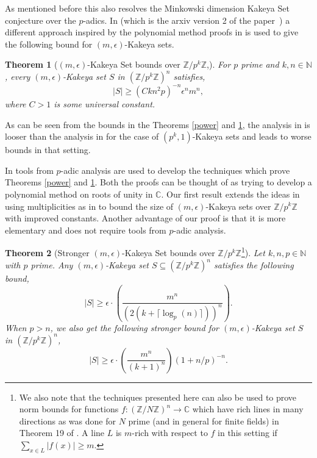 \documentclass[11pt]{article}
\numberwithin{equation}{section}
\newtheorem{thm}{Theorem}[section]
\def\Z{{\mathbb{Z}}}
\def\N{{\mathbb{N}}}
\def\C{{\mathbb{C}}}
\begin{document}
As mentioned before this also resolves the Minkowski dimension Kakeya Set conjecture over the $p$-adics. In \cite{arsovskiNew} (which is the arxiv version 2 of the paper~\cite{arsovski2021padic}) a different approach inspired by the polynomial method proofs in \cite{dvir2009size,saraf2008,dvir2013extensions} is used to give the following bound for $(m,\epsilon)$-Kakeya sets.

\begin{thm}[$(m,\epsilon)$-Kakeya Set bounds over $\Z/p^k\Z$,{\cite[Theorem~3]{arsovskiNew}}]\label{power2}
For $p$ prime and $k,n\in \N$, every $(m,\epsilon)$-Kakeya set $S$ in $(\Z/p^k\Z)^n$ satisfies,
$$|S|\ge (Ckn^2p)^{-n}\epsilon^n m^{n},$$
where $C>1$ is some universal constant.
\end{thm}

As can be seen from the bounds in the Theorems \ref{power} and \ref{power2}, the analysis in \cite{arsovskiNew} is looser than the analysis in \cite{arsovski2021padic} for the case of $(p^k,1)$-Kakeya sets and leads to worse bounds in that setting.


In \cite{arsovski2021padic,arsovskiNew} tools from $p$-adic analysis are used to develop the techniques which prove Theorems \ref{power} and \ref{power2}. Both the proofs can be thought of as trying to develop a polynomial method on roots of unity in $\C$. Our first result extends the ideas in \cite{arsovski2021padic} using multiplicities as in \cite{saraf2008,dvir2013extensions} to bound the size of $(m,\epsilon)$-Kakeya sets over $\Z/p^k\Z$ with improved constants. Another advantage of our proof is that it is more elementary and does not require tools from $p$-adic analysis.

\begin{thm}[Stronger $(m,\epsilon)$-Kakeya Set bounds over $\Z/p^k\Z$\footnote{We also note that the techniques presented here can also be used to prove norm bounds for functions $f:(\Z/N\Z)^n\rightarrow \C$ which have rich lines in many directions as was done for $N$ prime (and in general for finite fields) in Theorem 19 of \cite{dhar2019simple}. A line $L$ is $m$-rich with respect to $f$ in this setting if $\sum_{x\in L} |f(x)|\ge m$.  }]\label{thm:Smain}
Let $k,n,p\in \N$ with $p$ prime. Any $(m,\epsilon)$-Kakeya set $S\subseteq (\Z/p^k\Z)^n$ satisfies the following bound,
$$|S| \ge \epsilon\cdot\left(\frac{m^n}{(2(k+\lceil\log_p(n)\rceil))^n}\right).$$
When $p>n$, we also get the following stronger bound for $(m,\epsilon)$-Kakeya set $S$ in $(\Z/p^k\Z)^n$,
$$|S|\ge \epsilon\cdot\left(\frac{m^n}{(k+1)^n}\right) (1+n/p)^{-n}.$$
\end{thm}
\end{document}
